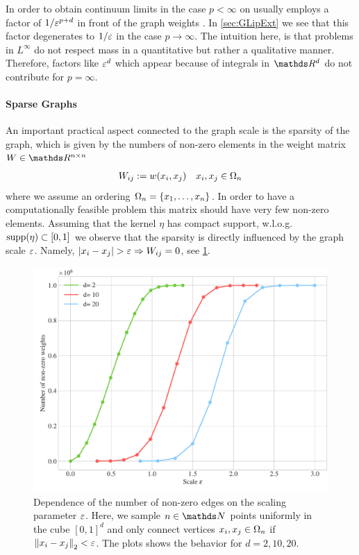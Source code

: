 %
%
%
\begin{remark}{}{}
In order to obtain continuum limits in the case $p<\infty$ on usually employs a factor of $1/\varepsilon^{p+d}$ in front of the graph weights \cite{GarcSlep15, slepcev2019analysis}. In \cref{sec:GLipExt} we see that this factor degenerates to $1/\varepsilon$ in the case $p\to\infty$. The intuition here, is that problems in $L^\infty$ do not respect mass in a quantitative but rather a qualitative manner. Therefore, factors like $\varepsilon^d$ which appear because of integrals in $\R^d$ do not contribute for $p=\infty$.
\end{remark}
%
%
\paragraph{Sparse Graphs}
An important practical aspect connected to the graph scale is the sparsity of the graph, which is given by the numbers of non-zero elements in the weight matrix $W\in\R^{n\times n}$
%
\begin{align*}
W_{ij}:= w(x_i,x_j) \quad x_i,x_j\in\Omega_n
\end{align*}
%
where we assume an ordering $\Omega_n=\{x_1,\ldots, x_n\}$. In order to have a computationally feasible problem this matrix should have very few non-zero elements. Assuming that the kernel $\eta$ has compact support, w.l.o.g. $\mathrm{supp}(\eta)\subset [0,1]$ we observe that the sparsity is directly influenced by the graph scale $\gscale$. Namely, $\left|x_i-x_j\right| > \varepsilon \Rightarrow W_{ij}=0$, see \cref{fig:graphscale}.
%
%
\begin{figure}
\centering
\includegraphics[width=.5\textwidth]{code/SSL/NNZ.pdf}
\caption[Dependence of the number of non-zero edges on the scaling parameter $\gscale$.]{Dependence of the number of non-zero edges on the scaling parameter $\gscale$. Here, we sample $n\in\N$ points uniformly in the cube $[0,1]^d$ and only connect vertices $x_i,x_j\in\Omega_n$ if $\left\|x_i-x_j\right\|_2 < \varepsilon$. The plots shows the behavior for $d=2,10,20$.}\label{fig:graphscale}
\end{figure} 
